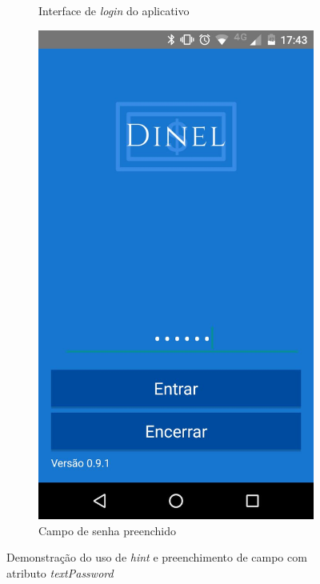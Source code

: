\documentclass[hidelinks,12pt]{article}
\begin{document}
\begin{figure}[H]
\begin{subfigure}{0.5\textwidth}
		\caption{Interface de \textit{login} do aplicativo}
		\label{login}
	\end{subfigure}
	\begin{subfigure}{0.5\textwidth}
		\includegraphics[scale=0.3]{login_pass}
		\caption{Campo de senha preenchido}
		\label{login_pass}
	\end{subfigure}
	\caption{Demonstra\c{c}\~ao do uso de \textit{hint} e preenchimento de campo com atributo \textit{textPassword}}
	\label{pass}
\end{figure}
\end{document}

